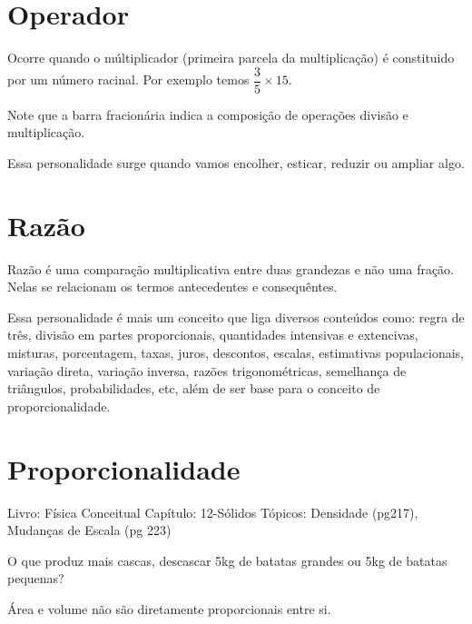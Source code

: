 \begin{enumerate}
\section{Operador}
Ocorre quando o múltiplicador (primeira parcela da multiplicação) é constituido por um número racinal. Por exemplo temos $\dfrac{3}{5}\times 15$.



Note que a barra fracionária indica a composição de operações divisão e multiplicação. 

Essa personalidade surge quando vamos encolher, esticar, reduzir ou ampliar algo.

\section{Razão}

Razão é uma comparação multiplicativa entre duas grandezas e não uma fração. Nelas se relacionam os termos antecedentes e consequêntes.

Essa personalidade é mais um conceito que liga diversos conteúdos como: regra de três, divisão em partes proporcionais, quantidades intensivas e extencivas, misturas, porcentagem, taxas, juros, descontos, escalas, estimativas populacionais, variação direta, variação inversa, razões trigonométricas, semelhança de triângulos, probabilidades, etc, além de ser base para o conceito de proporcionalidade.

\section{Proporcionalidade}
\end{enumerate}



Livro: Física Conceitual
Capítulo: 12-Sólidos
Tópicos: Densidade (pg217), Mudanças de Escala (pg 223)

O que produz mais cascas, descascar 5kg de batatas grandes ou 5kg de batatas pequenas?

Área e volume não são diretamente proporcionais entre si.

